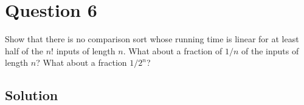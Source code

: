 
\section*{Question 6}

Show that there is no comparison sort whose running time is linear for at least half of the $n!$ inputs of length $n$.
What about a fraction of $1/n$ of the inputs of length $n$? What about a fraction $1/2^n$?

\subsection*{Solution}

